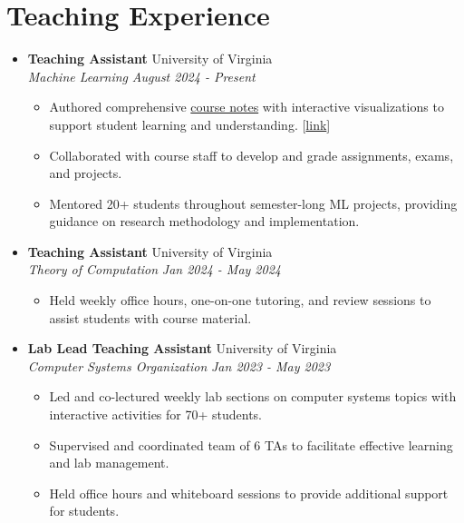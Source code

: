 \documentclass[letterpaper,11pt]{article}
\newcommand{\linkhref}[2]{\textcolor{linkblue}{\href{#1}{#2}}}
\newcommand{\Date}[1]{\textit{\small #1}}
\newcommand{\heading}[4]{
  \textbf{#1} \hfill #2 \\
  \textit{\small#3} \hfill \Date{#4}
}
\begin{document}
\section{Teaching Experience}
\begin{itemize}[label={}, leftmargin=0pt]
  \item \heading{Teaching Assistant}{University of Virginia}
        {Machine Learning}{August 2024 - Present}
        \begin{itemize}
          \item Authored comprehensive \href{https://www.brandonyifanyang.com/notes/ml}{course notes} with interactive visualizations to support student learning and understanding. [\linkhref{https://www.brandonyifanyang.com/notes/ml}{link}]
          \item Collaborated with course staff to develop and grade assignments, exams, and projects.
          \item Mentored 20+ students throughout semester-long ML projects, providing guidance on research methodology and implementation.
        \end{itemize}
  \item \heading{Teaching Assistant}{University of Virginia}
        {Theory of Computation}{Jan 2024 - May 2024}
        \begin{itemize}
          \item Held weekly office hours, one-on-one tutoring, and review sessions to assist students with course material.
        \end{itemize}
  \item \heading{Lab Lead Teaching Assistant}{University of Virginia}
        {Computer Systems Organization}{Jan 2023 - May 2023}
        \begin{itemize}
          \item Led and co-lectured weekly lab sections on computer systems topics with interactive activities for 70+ students.
          \item Supervised and coordinated team of 6 TAs to facilitate effective learning and lab management.
          \item Held office hours and whiteboard sessions to provide additional support for students.
        \end{itemize}
\end{itemize}
\end{document}
